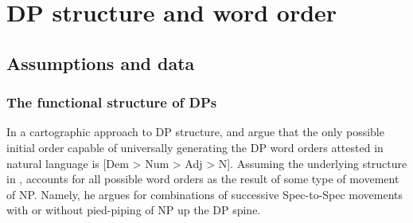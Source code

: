 \documentclass[output=paper]{langscibook}
\begin{document}
\section{DP structure and word order} 
\subsection{Assumptions and data}
\label{sec:baron:2.1}
\subsubsection{The functional structure of DPs}
\label{sec:baron:2.1.1}
In a cartographic approach to DP structure, \citet{Greenberg1963} and \citet{Cinque2005} argue that the only possible initial order capable of universally generating the DP word orders attested in natural language is [Dem > Num > Adj > N]. Assuming the underlying structure in , \citeauthor{Cinque2005} accounts for all possible word orders as the result of some type of movement of NP. Namely, he argues for combinations of successive Spec-to-Spec movements with or without pied-piping of NP up the DP spine. 
\end{document}
